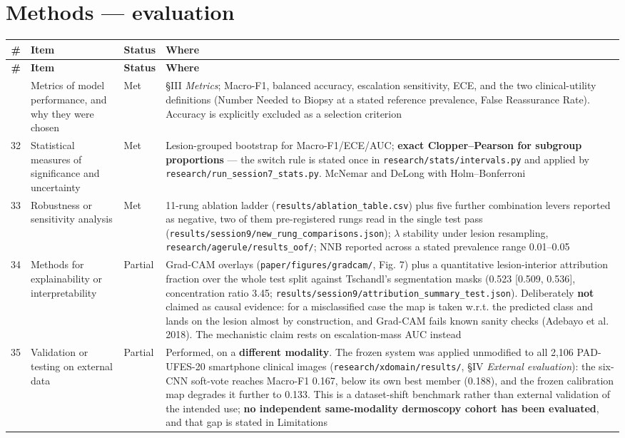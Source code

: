 \documentclass[10pt,a4paper]{article}
\begin{document}
\section*{Methods --- evaluation}


\begin{longtable}{@{}rp{}lp{}@{}}
\toprule
\textbf{\#} & \textbf{Item} & \textbf{Status} & \textbf{Where} \\
\midrule
\endfirsthead
\toprule
\textbf{\#} & \textbf{Item} & \textbf{Status} & \textbf{Where} \\
\midrule
\endhead
\bottomrule
\endfoot
31 & Metrics of model performance, and why they were chosen & Met & \S{}III \emph{Metrics}; Macro-F1, balanced accuracy, escalation sensitivity, ECE, and the two clinical-utility definitions (Number Needed to Biopsy at a stated reference prevalence, False Reassurance Rate). Accuracy is explicitly excluded as a selection criterion \\
32 & Statistical measures of significance and uncertainty & Met & Lesion-grouped bootstrap for Macro-F1/ECE/AUC; \textbf{exact Clopper--Pearson for subgroup proportions} --- the switch rule is stated once in \texttt{research/stats/intervals.py} and applied by \texttt{research/run\_session7\_stats.py}. McNemar and DeLong with Holm--Bonferroni \\
33 & Robustness or sensitivity analysis & Met & 11-rung ablation ladder (\texttt{results/ablation\_table.csv}) plus five further combination levers reported as negative, two of them pre-registered rungs read in the single test pass (\texttt{results/session9/new\_rung\_comparisons.json}); $\lambda$ stability under lesion resampling, \texttt{research/agerule/results\_oof/}; NNB reported across a stated prevalence range 0.01--0.05 \\
34 & Methods for explainability or interpretability & Partial & Grad-CAM overlays (\texttt{paper/figures/gradcam/}, Fig. 7) plus a quantitative lesion-interior attribution fraction over the whole test split against Tschandl's segmentation masks (0.523 [0.509, 0.536], concentration ratio 3.45; \texttt{results/session9/attribution\_summary\_test.json}). Deliberately \textbf{not} claimed as causal evidence: for a misclassified case the map is taken w.r.t. the predicted class and lands on the lesion almost by construction, and Grad-CAM fails known sanity checks (Adebayo et al. 2018). The mechanistic claim rests on escalation-mass AUC instead \\
35 & Validation or testing on external data & Partial & Performed, on a \textbf{different modality}. The frozen system was applied unmodified to all 2,106 PAD-UFES-20 smartphone clinical images (\texttt{research/xdomain/results/}, \S{}IV \emph{External evaluation}): the six-CNN soft-vote reaches Macro-F1 0.167, below its own best member (0.188), and the frozen calibration map degrades it further to 0.133. This is a dataset-shift benchmark rather than external validation of the intended use; \textbf{no independent same-modality dermoscopy cohort has been evaluated}, and that gap is stated in Limitations \\

\end{longtable}
\end{document}
